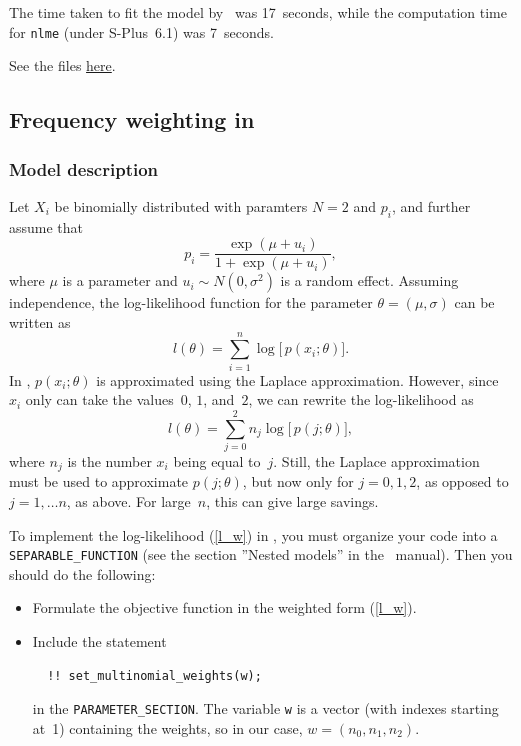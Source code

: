 \documentclass{admbmanual}
\begin{document}
The time taken to fit the model by \scAR\ was 17~seconds, while the computation
time for \texttt{nlme} (under S-Plus~6.1) was 7~seconds.

See the files
\href{http://otter-rsch.com/admbre/examples/pheno/pheno.html}{here}.

\subsection{Frequency weighting in \scAR}
\label{seq:frequency_example}

\subsubsection{Model description}

Let $X_{i}$ be binomially distributed with paramters $N=2$ and $p_{i}$, and
further assume that
\begin{equation}
p_{i}=\frac{\exp (\mu +u_{i})}{1+\exp (\mu +u_{i})},
\end{equation}%
where $\mu $ is a parameter and $u_{i}\sim N(0,\sigma ^{2})$ is a random effect.
Assuming independence, the log-likelihood function for the parameter $\theta
=(\mu ,\sigma )$ can be written as
\begin{equation}
l(\theta )=\sum_{i=1}^{n}\log \bigl[\, p(x_{i};\theta )\bigr] .
\end{equation}%
In \scAR, $p(x_{i};\theta )$ is approximated using the Laplace approximation.
However, since $x_{i}$ only can take the values~$0$, $1$, and~$2$, we can
rewrite the log-likelihood as
\begin{equation}
l(\theta )=\sum_{j=0}^{2}n_{j}\log \bigl[\, p(j;\theta )\bigr] ,  \label{l_w}
\end{equation}%
where $n_{j}$ is the number $x_{i}$ being equal to~$j$. Still, the Laplace
approximation must be used to approximate $p(j;\theta )$, but now only for
$j=0,1,2$, as opposed to $j = 1,\dots n$, as above. For large~$n$, this can give
large savings.

To implement the log-likelihood (\ref{l_w}) in \scAR, you must organize your
code into a \texttt{SEPARABLE\_FUNCTION} (see the section ''Nested models'' in
the \scAR\ manual). Then you should do the following:
\begin{itemize}
\item Formulate the objective function in the weighted form (\ref{l_w}).

\item Include the statement
  \begin{lstlisting}
  !! set_multinomial_weights(w);
  \end{lstlisting}
in the \texttt{PARAMETER\_SECTION}. The variable \texttt{w} is a vector (with
indexes starting at~1) containing the weights, so in our case,
$w=(n_{0},n_{1},n_{2})$.
\end{itemize}
\end{document}
